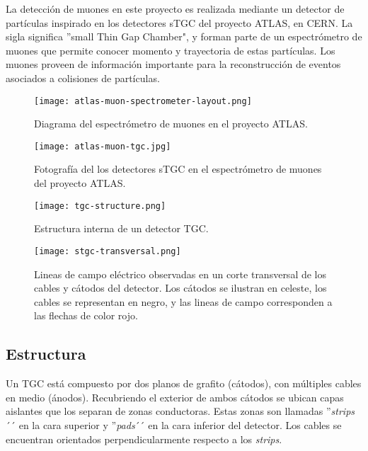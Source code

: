 
La detección de muones en este proyecto es realizada mediante un detector de partículas inspirado en los detectores sTGC del proyecto ATLAS, en CERN. La sigla significa ''small Thin Gap Chamber", y forman parte de un espectrómetro de muones que permite conocer momento y trayectoria de estas partículas. Los muones proveen de información importante para la reconstrucción de eventos asociados a colisiones de partículas.

\begin{figure}[h]
	\centering
	\texttt{[image: atlas-muon-spectrometer-layout.png]}
	\caption{Diagrama del espectrómetro de muones en el proyecto ATLAS\cite{AtlasMuonDiagram}.}
	\label{img:atlas-layout}
\end{figure}

\newpage
\begin{figure}[h]
	\centering
	\texttt{[image: atlas-muon-tgc.jpg]}
	\caption{Fotografía del los detectores sTGC en el espectrómetro de muones del proyecto ATLAS\cite{AtlasMuonSpect}.}
	\label{img:atlas-tgc}
\end{figure}

\begin{figure}[h]
	\centering
	\texttt{[image: tgc-structure.png]}
	\caption{Estructura interna de un detector TGC\cite{Chapman2014}.}
	\label{img:stgc-structure}
\end{figure}

\begin{figure}[h]
	\centering
	\texttt{[image: stgc-transversal.png]}
	\caption{Lineas de campo eléctrico observadas en un corte transversal de los cables y cátodos del detector. Los cátodos se ilustran en celeste, los cables se representan en negro, y las lineas de campo corresponden a las flechas de color rojo\cite{GEMTracker}.}
	\label{img:stgc-field}
\end{figure}

\newpage
\subsection*{Estructura}

	Un TGC está compuesto por dos planos de grafito (cátodos), con múltiples cables en medio (ánodos). Recubriendo el exterior de ambos cátodos se ubican capas aislantes que los separan de zonas conductoras. Estas zonas son llamadas ''\textit{strips}´´ en la cara superior y ''\textit{pads}´´ en la cara inferior del detector. Los cables se encuentran orientados perpendicularmente respecto a los \textit{strips}.
	
